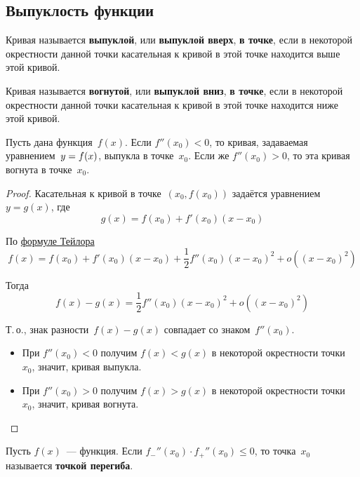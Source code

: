 \subsection{Выпуклость функции}
Кривая называется \textbf{выпуклой}, или \textbf{выпуклой вверх}, \textbf{в точке}, если в некоторой окрестности данной точки касательная к кривой в этой точке находится выше этой кривой.

Кривая называется \textbf{вогнутой}, или \textbf{выпуклой вниз}, \textbf{в точке}, если в некоторой окрестности данной точки касательная к кривой в этой точке находится ниже этой кривой.

\begin{theorem}
Пусть дана функция~$f(x)$.
Если $f''(x_0) < 0$, то кривая, задаваемая уравнением~$y \opbr= f(x)$, выпукла в точке~$x_0$.
Если же $f''(x_0) > 0$, то эта кривая вогнута в точке~$x_0$.
\end{theorem}
\begin{proof}
Касательная к кривой в точке~$(x_0, f(x_0))$ задаётся уравнением~$y = g(x)$, где
\begin{equation*}
g(x) = f(x_0) + f'(x_0)(x - x_0)
\end{equation*}

По \hyperref[eq:Taylor_series]{формуле Тейлора}
\begin{equation*}
f(x) = f(x_0) + f'(x_0)(x - x_0) + \frac12 f''(x_0)(x - x_0)^2 + o((x - x_0)^2)
\end{equation*}

Тогда
\begin{equation*}
f(x) - g(x) = \frac12 f''(x_0)(x - x_0)^2 + o((x - x_0)^2)
\end{equation*}

Т.\,о., знак разности~$f(x) - g(x)$ совпадает со знаком~$f''(x_0)$.
\begin{itemize}
	\item При $f''(x_0) < 0$ получим $f(x) < g(x)$ в некоторой окрестности точки~$x_0$, значит, кривая выпукла.
	\item При $f''(x_0) > 0$ получим $f(x) > g(x)$ в некоторой окрестности точки~$x_0$, значит, кривая вогнута.
\end{itemize}
\end{proof}

Пусть $f(x)$~--- функция.
 Если $f_-''(x_0) \cdot f_+''(x_0) \leqslant 0$, то точка~$x_0$ называется \textbf{точкой перегиба}.